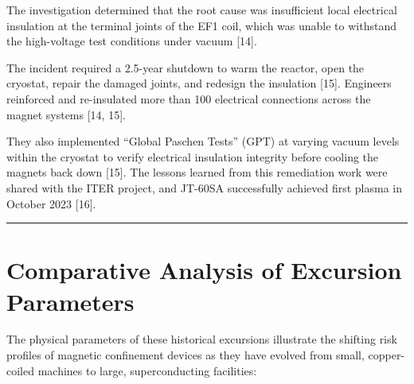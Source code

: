 \documentclass[11pt,a4paper]{article}
\begin{document}
The investigation determined that the root cause was insufficient local electrical insulation at the terminal joints of the EF1 coil, which was unable to withstand the high-voltage test conditions under vacuum {[}14{]}.

The incident required a 2.5-year shutdown to warm the reactor, open the cryostat, repair the damaged joints, and redesign the insulation {[}15{]}. Engineers reinforced and re-insulated more than 100 electrical connections across the magnet systems {[}14, 15{]}.

They also implemented ``Global Paschen Tests'' (GPT) at varying vacuum levels within the cryostat to verify electrical insulation integrity before cooling the magnets back down {[}15{]}. The lessons learned from this remediation work were shared with the ITER project, and JT-60SA successfully achieved first plasma in October 2023 {[}16{]}.

\begin{center}\rule{0.5\linewidth}{0.5pt}\end{center}

\hypertarget{comparative-analysis-of-excursion-parameters}{%
\section{Comparative Analysis of Excursion Parameters}\label{comparative-analysis-of-excursion-parameters}}

The physical parameters of these historical excursions illustrate the shifting risk profiles of magnetic confinement devices as they have evolved from small, copper-coiled machines to large, superconducting facilities:
\end{document}
